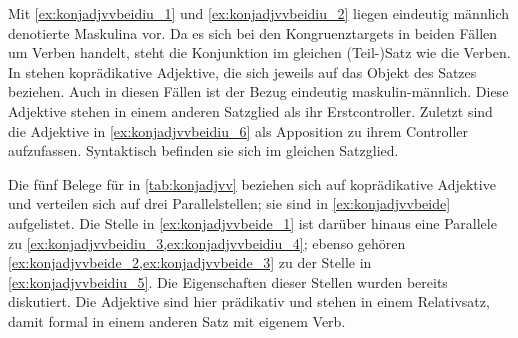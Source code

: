Mit   \cref{ex:konjadjvvbeidiu_1} und 
 \cref{ex:konjadjvvbeidiu_2} liegen eindeutig männlich
denotierte Maskulina vor. Da es sich bei den Kongruenztargets in beiden Fällen
um Verben handelt, steht die Konjunktion im gleichen (Teil-)Satz wie die
Verben. In  stehen
koprädikative Adjektive, die sich jeweils auf das Objekt des Satzes beziehen.
Auch in diesen Fällen ist der Bezug eindeutig maskulin-männlich. Diese
Adjektive stehen in einem anderen Satzglied als ihr Erstcontroller. Zuletzt
sind die Adjektive in \cref{ex:konjadjvvbeidiu_6} als Apposition zu ihrem
Controller aufzufassen. Syntaktisch befinden sie sich im gleichen Satzglied.

Die fünf Belege für  in \cref{tab:konjadjvv} beziehen sich auf
koprädikative Adjektive und verteilen sich auf drei Parallelstellen; sie sind
in \cref{ex:konjadjvvbeide} aufgelistet. Die Stelle in
\cref{ex:konjadjvvbeide_1} ist darüber hinaus eine Parallele zu
\cref{ex:konjadjvvbeidiu_3,ex:konjadjvvbeidiu_4}; ebenso gehören
\cref{ex:konjadjvvbeide_2,ex:konjadjvvbeide_3} zu der Stelle in
\cref{ex:konjadjvvbeidiu_5}. Die Eigenschaften dieser Stellen wurden bereits
diskutiert. Die Adjektive sind hier prädikativ und stehen in einem Relativsatz,
damit formal in einem anderen Satz mit eigenem Verb.

